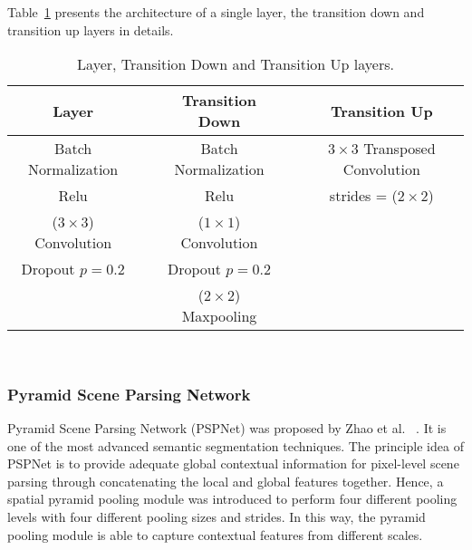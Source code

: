 Table~\ref{layers} presents the architecture of a single layer, the transition down  and transition up layers in details.
\begin{table}[h!]
	\renewcommand{\arraystretch}{1.3}
	\centering
	\scriptsize
	\resizebox{\textwidth}{!}
	{
		\begin{tabular}{ccccc}
			\hline
			Layer &  &  Transition Down &  &  Transition Up \\ 
			\hline
			Batch Normalization &  & Batch Normalization &  &  \(3\times 3\) Transposed Convolution  \\ 
			Relu &  & Relu &  & strides = (\(2\times2\))  \\ 
			(\(3\times3\)) Convolution &  & (\(1\times1\)) Convolution &  &  \\ 
			Dropout \(p=0.2\) &  &Dropout \(p=0.2\)  &  &  \\ 
			&  & (\(2\times2\)) Maxpooling &  &  \\ 
			\hline
		\end{tabular}
	}
	\caption{Layer, Transition Down and Transition Up layers.} 
	\label{layers}
	
\end{table}\\


\subsubsection{Pyramid Scene Parsing Network}
Pyramid Scene Parsing Network (PSPNet) was proposed by Zhao et al.~\cite{zhao2017pyramid} .
It is one of the most advanced semantic segmentation techniques. 
The principle idea of PSPNet is to provide adequate global contextual information for pixel-level scene parsing through concatenating the local and global features together. 
Hence, a spatial pyramid pooling module was introduced to perform four different pooling levels with four different pooling sizes and strides.
In this way, the pyramid pooling module is able to capture contextual features from different scales.

